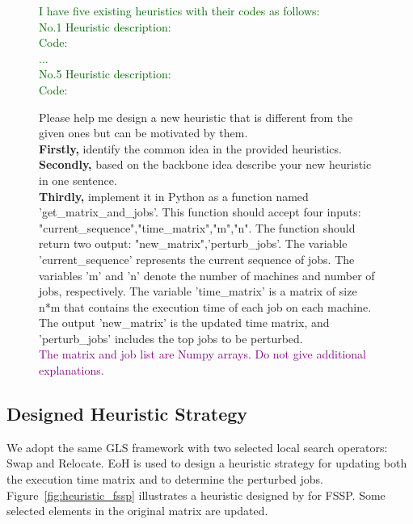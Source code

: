 \begin{figure}[t]
\begin{minipage}{0.61\textwidth}
\begin{dialogbox}
  \textcolor{darkgreen}{I have five existing heuristics with their codes as follows: \\
  No.1 Heuristic description: \\
       Code:   \\
       ... \\
  No.5 Heuristic description: \\
       Code: \\  } 
       
   Please help me design a new heuristic that is different from the given ones but can be motivated by them. \\
   \textbf{Firstly,} identify the common idea in the provided heuristics.   \\
   \textbf{Secondly,} based on the backbone idea \textcolor{navyblue}{describe your new heuristic in one sentence.} \\
   \textbf{Thirdly,} implement it in Python as a function named \textcolor{navyblue}{'get\_matrix\_and\_jobs'}. This function should accept \textcolor{navyblue}{four inputs: "current\_sequence","time\_matrix","m","n"}. The function should return \textcolor{navyblue}{two output: "new\_matrix",'perturb\_jobs'}. \textcolor{navyblue}{The variable 'current\_sequence' represents the current sequence of jobs. The variables 'm' and 'n' denote the number of machines and number of jobs, respectively. The variable 'time\_matrix' is a matrix of size n*m that contains the execution time of each job on each machine. The output 'new\_matrix' is the updated time matrix, and 'perturb\_jobs' includes the top jobs to be perturbed.}   \\

  \textcolor{purple}{The matrix and job list are Numpy arrays. Do not give additional explanations.}
\end{dialogbox}
\end{minipage}
\end{figure}


\subsection{Designed Heuristic Strategy}
We adopt the same GLS framework with two selected local search operators: Swap and Relocate. EoH is used to design a heuristic strategy for updating both the execution time matrix and to determine the perturbed jobs. 
Figure~\ref{fig:heuristic_fssp} illustrates a heuristic designed by \ourmethod{} for FSSP. Some selected elements in the original matrix are updated. 


